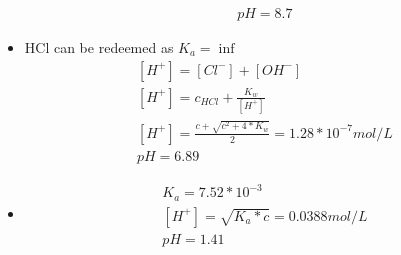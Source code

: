 \documentclass{article}
\begin{document}
\begin{itemize}
\begin{equation}
\begin{multlined}
            pH = 8.7
        \end{multlined}
    \end{equation}
    \item
    HCl can be redeemed as $K_a = \inf$
    \begin{equation}
        \begin{multlined}
            \left[H^+\right] = \left[Cl^-\right] + \left[OH^-\right]\\
            \left[H^+\right] = c_{HCl} + \frac{K_w}{\left[H^+\right]}\\
            \left[H^+\right] = \frac{c+\sqrt{c^2+4*K_w}}{2} = 1.28*10^{-7} mol/L\\
            pH = 6.89
        \end{multlined}
    \end{equation}
    \item
    \begin{equation}
        \begin{multlined}
            K_a = 7.52*10^{-3}\\
            \left[H^+\right] = \sqrt{K_a*c} = 0.0388 mol/L\\
            pH = 1.41
        \end{multlined}
    \end{equation}
\end{itemize}
\end{document}
